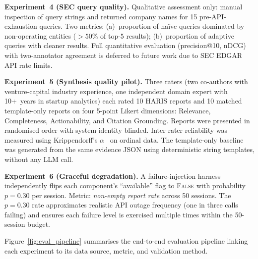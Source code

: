 \documentclass[preprint,12pt]{elsarticle}
\begin{document}
\textbf{Experiment~4 (SEC query quality).} Qualitative assessment only: manual
inspection of query strings and returned company names for 15 pre-API-exhaustion
queries. Two metrics: (a)~proportion of na\"ive queries dominated by non-operating
entities ($>50\%$ of top-5 results); (b)~proportion of adaptive queries with
cleaner results. Full quantitative evaluation (precision@10, nDCG) with
two-annotator agreement is deferred to future work due to SEC EDGAR API rate
limits.

\textbf{Experiment~5 (Synthesis quality pilot).} Three raters (two co-authors
with venture-capital industry experience, one independent domain expert with
10+~years in startup analytics) each rated 10 HARIS reports and 10 matched
template-only reports on four 5-point Likert dimensions: Relevance,
Completeness, Actionability, and Citation Grounding. Reports were presented in
randomised order with system identity blinded. Inter-rater reliability was
measured using Krippendorff's $\alpha$~\cite{krippendorff2004content} on ordinal
data. The template-only baseline was generated from the same evidence JSON using
deterministic string templates, without any LLM call.

\textbf{Experiment~6 (Graceful degradation).} A failure-injection harness
independently flips each component's ``available'' flag to \textsc{False} with
probability $p{=}0.30$ per session. Metric: \emph{non-empty report rate} across
50 sessions. The $p{=}0.30$ rate approximates realistic API outage frequency
(one in three calls failing) and ensures each failure level is exercised multiple
times within the 50-session budget.

Figure~\ref{fig:eval_pipeline} summarises the end-to-end evaluation pipeline
linking each experiment to its data source, metric, and validation method.
\end{document}
